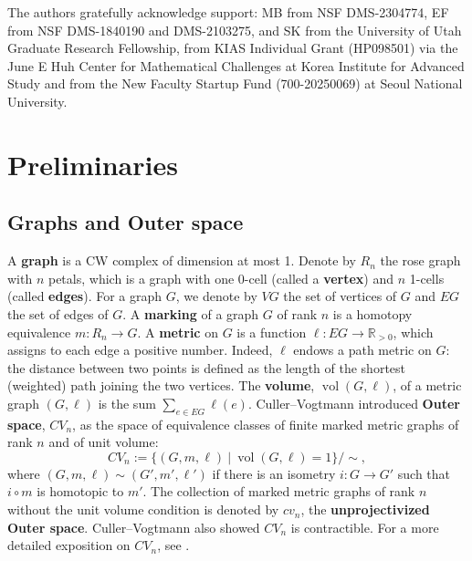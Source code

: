 \documentclass[11pt, letterpaper]{amsart}
\theoremstyle{plain}
\theoremstyle{definition}
\newcommand{\R}{\mathbb{R}}
\DeclareMathOperator{\vol}{vol}
\begin{document}
The authors gratefully acknowledge support: MB from NSF DMS-2304774, EF from NSF
DMS-1840190 and DMS-2103275, and SK from the University of Utah Graduate
Research Fellowship, from KIAS Individual Grant (HP098501) via the June E
Huh Center for Mathematical Challenges at Korea Institute for Advanced Study and from the New Faculty Startup Fund (700-20250069) at Seoul National University.


\tableofcontents


\section{Preliminaries}
\label{sec:prelim}


\subsection{Graphs and Outer space} \label{ssec:graphsandCVn}
A \textbf{graph} is a CW complex of dimension at most 1. Denote by $R_n$ the
rose graph with $n$ petals, which is a graph with one 0-cell (called a
\textbf{vertex}) and $n$ 1-cells (called \textbf{edges}). For a graph $G$, we denote by $VG$ the
set of vertices of $G$ and $EG$ the set of edges of $G$. A \textbf{marking} of
a graph $G$ of rank $n$ is a homotopy equivalence $m : R_n \to G$. A \textbf{metric} on $G$ is a function
$\ell:EG \to \R_{>0}$, which assigns to each edge a positive number. Indeed,
$\ell$ endows a path metric on $G$: the distance between two points is defined
as the length of the shortest (weighted) path joining the two vertices. The
\textbf{volume}, $\vol(G,\ell)$, of a metric graph $(G,\ell)$ is the sum $\sum_{e \in EG}\ell(e)$.
Culler--Vogtmann \cite{culler1986moduli} introduced 
\textbf{Outer space}, $CV_n$, as the space of equivalence classes of
finite marked metric
graphs of rank $n$ and of unit volume:
\[
  CV_{n}:= \{(G, m, \ell)\ |\ \vol(G,\ell)=1\}/\sim,
\]
where $(G,m,\ell) \sim (G',m',\ell')$ if there is an isometry $i:G \to G'$ such
that $i\circ m$ is homotopic to $m'$. The collection of marked metric graphs of
rank $n$ without the unit volume condition is denoted by $cv_n$, the
\textbf{unprojectivized Outer space}. Culler--Vogtmann also showed $CV_n$ is contractible.
For a more detailed exposition on $CV_n$, see \cite{bestvina2014PCMI}.
\end{document}
